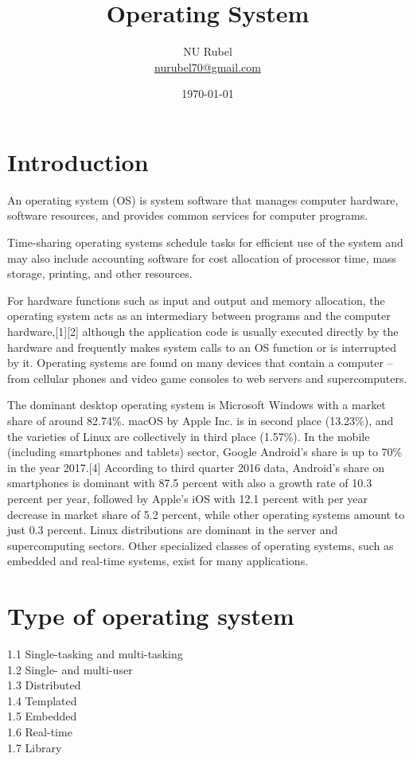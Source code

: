 \documentclass[oneside, 11 pt]{report}
\title{Operating System}
\date{\today}
\author{NU Rubel \\ \href{mailto:nurubel70@gmail.com}{nurubel70@gmail.com}}
\begin{document}
\maketitle

\section*{Introduction}
An operating system (OS) is system software that manages computer hardware, software resources, and provides common services for computer programs.

Time-sharing operating systems schedule tasks for efficient use of the system and may also include accounting software for cost allocation of processor time, mass storage, printing, and other resources.

For hardware functions such as input and output and memory allocation, the operating system acts as an intermediary between programs and the computer hardware,[1][2] although the application code is usually executed directly by the hardware and frequently makes system calls to an OS function or is interrupted by it. Operating systems are found on many devices that contain a computer – from cellular phones and video game consoles to web servers and supercomputers.

The dominant desktop operating system is Microsoft Windows with a market share of around 82.74\%. macOS by Apple Inc. is in second place (13.23\%), and the varieties of Linux are collectively in third place (1.57\%). In the mobile (including smartphones and tablets) sector, Google Android's share is up to 70\% in the year 2017.[4] According to third quarter 2016 data, Android's share on smartphones is dominant with 87.5 percent with also a growth rate of 10.3 percent per year, followed by Apple's iOS with 12.1 percent with per year decrease in market share of 5.2 percent, while other operating systems amount to just 0.3 percent. Linux distributions are dominant in the server and supercomputing sectors. Other specialized classes of operating systems, such as embedded and real-time systems, exist for many applications.

\tableofcontents

\section{Type of operating system}
	
1.1	Single-tasking and multi-tasking\\
1.2	Single- and multi-user\\
1.3	Distributed\\
1.4	Templated\\
1.5	Embedded\\
1.6	Real-time\\
1.7	Library\\
\end{document}
